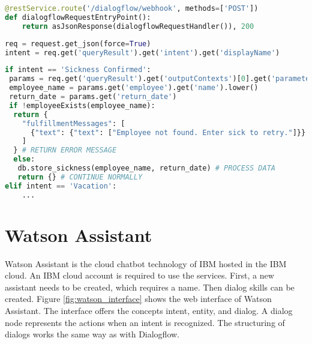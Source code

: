 \begin{lstlisting}[caption={Dialogflow Webhook Entry Point}, label={lst:dialogflow_entry_point},captionpos=b,frame=single,language={Python},commentstyle=\color{mygreen},keywordstyle=\color{blue},
    morekeywords={}]                
@restService.route('/dialogflow/webhook', methods=['POST'])
def dialogflowRequestEntryPoint():
    return asJsonResponse(dialogflowRequestHandler()), 200
\end{lstlisting}  

\begin{lstlisting}[caption={Dialogflow Request Parameters}, label={lst:dialogflow_request_params},captionpos=b,frame=single,language={Python},commentstyle=\color{mygreen},keywordstyle=\color{blue},
    morekeywords={}]                
req = request.get_json(force=True)
intent = req.get('queryResult').get('intent').get('displayName')
\end{lstlisting}  

\begin{lstlisting}[caption={Dialogflow Intent Handling}, label={lst:dialogflow_intent_handling},captionpos=b,frame=single,language={Python},commentstyle=\color{mygreen},keywordstyle=\color{blue},
    morekeywords={}]                
if intent == 'Sickness Confirmed':
 params = req.get('queryResult').get('outputContexts')[0].get('parameters')
 employee_name = params.get('employee').get('name').lower()
 return_date = params.get('return_date')
 if !employeeExists(employee_name):
  return {
    "fulfillmentMessages": [
      {"text": {"text": ["Employee not found. Enter sick to retry."]}}
    ]
  } # RETURN ERROR MESSAGE
  else:
   db.store_sickness(employee_name, return_date) # PROCESS DATA
   return {} # CONTINUE NORMALLY
elif intent == 'Vacation':
    ...
\end{lstlisting}  

\section{Watson Assistant}
Watson Assistant\citet{watsonassistant} is the cloud chatbot technology of IBM hosted in the IBM cloud.
An IBM cloud account is required to use the services.
First, a new assistant needs to be created, which requires a name.
Then dialog skills can be created.
Figure \ref{fig:watson_interface} shows the web interface of Watson Assistant.
The interface offers the concepts intent, entity, and dialog.
A dialog node represents the actions when an intent is recognized.
The structuring of dialogs works the same way as with Dialogflow.

